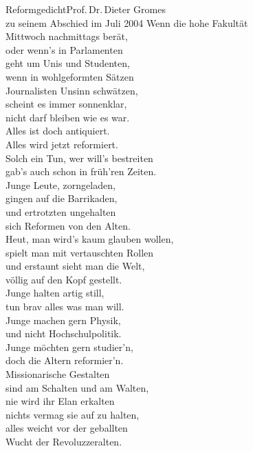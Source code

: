 
\begin{lied*}{Reformgedicht}{Prof.\,Dr.\,Dieter Gromes\\zu seinem Abschied im Juli 2004}
Wenn die hohe Fakultät\\
Mittwoch nachmittags berät,\\
oder wenn's in Parlamenten\\
geht um Unis und Studenten,\\
wenn in wohlgeformten Sätzen\\
Journalisten Unsinn schwätzen,\\
scheint es immer sonnenklar,\\
nicht darf bleiben wie es war.\\
Alles ist doch antiquiert.\\
Alles wird jetzt reformiert.\\

Solch ein Tun, wer will's bestreiten\\
gab's auch schon in früh'ren Zeiten.\\
Junge Leute, zorngeladen,\\
gingen auf die Barrikaden,\\
und ertrotzten ungehalten\\
sich Reformen von den Alten.\\

Heut, man wird's kaum glauben wollen,\\
spielt man mit vertauschten Rollen\\
und erstaunt sieht man die Welt,\\
völlig auf den Kopf gestellt.\\

Junge halten artig still,\\
tun brav alles was man will.\\
Junge machen gern Physik,\\
und nicht Hochschulpolitik.\\
Junge möchten gern studier'n,\\
doch die Altern reformier'n.\\

Missionarische Gestalten\\
sind am Schalten und am Walten,\\
nie wird ihr Elan erkalten\\
nichts vermag sie auf zu halten,\\
alles weicht vor der geballten\\
Wucht der Revoluzzeralten.\\


\end{lied*}

